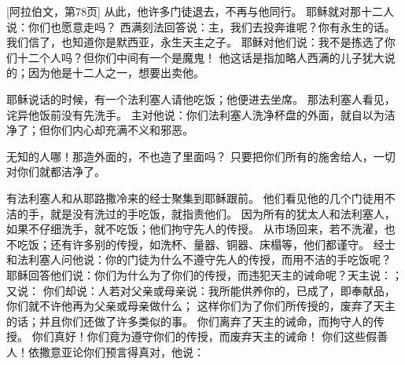 [阿拉伯文，第78页]  从此，他许多门徒退去，不再与他同行。 耶稣就对那十二人说：你们也愿意走吗？ 西满刻法回答说：主，我们去投奔谁呢？你有永生的话。 我们信了，也知道你是默西亚，永生天主之子。 耶稣对他们说：我不是拣选了你们十二个人吗？但你们中间有一个是魔鬼！ 他这话是指加略人西满的儿子犹大说的；因为他是十二人之一，想要出卖他。\par

 耶稣说话的时候，有一个法利塞人请他吃饭；他便进去坐席。 那法利塞人看见，诧异他饭前没有先洗手。 主对他说：你们法利塞人洗净杯盘的外面，就自以为洁净了；但你们内心却充满不义和邪恶。\par

 无知的人哪！那造外面的，不也造了里面吗？ 只要把你们所有的施舍给人，一切对你们就都洁净了。\par

 有法利塞人和从耶路撒冷来的经士聚集到耶稣跟前。 他们看见他的几个门徒用不洁的手，就是没有洗过的手吃饭，就指责他们。 因为所有的犹太人和法利塞人，如果不仔细洗手，就不吃饭；他们拘守先人的传授。 从市场回来，若不洗濯，也不吃饭；还有许多别的传授，如洗杯、量器、铜器、床榻等，他们都谨守。 经士和法利塞人问他说：你的门徒为什么不遵守先人的传授，而用不洁的手吃饭呢？ 耶稣回答他们说：你们为什么为了你们的传授，而违犯天主的诫命呢？天主说：；又说： 你们却说：人若对父亲或母亲说：我所能供养你的，已成了，即奉献品， 你们就不许他再为父亲或母亲做什么； 这样你们为了你们所传授的，废弃了天主的话；并且你们还做了许多类似的事。 你们离弃了天主的诫命，而拘守人的传授。 你们真好！你们竟为遵守你们的传授，而废弃天主的诫命！ 你们这些假善人！依撒意亚论你们预言得真对，他说：\par

\par

\par

